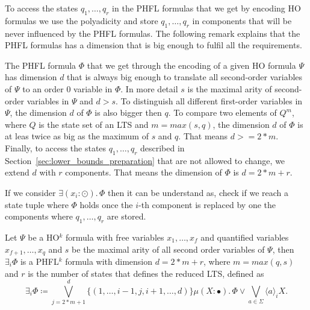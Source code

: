 To access the states $q_1, \dots, q_r$ in the PHFL formulas that we get by encoding HO formulas we use the polyadicity and store $q_1, \dots, q_r$ in components that will be never influenced by the PHFL formulas. The following remark explains that the PHFL formulas has a dimension that is big enough to fulfil all the requirements. 

\begin{remark}
    The PHFL formula $\Phi$ that we get through the encoding of a given HO formula $\Psi$ has dimension
    $d$ that is always big enough to translate all second-order variables of $\Psi$ to an order $0$ variable in
    $\Phi$. In more detail $s$ is the maximal arity of second-order variables in $\Psi$ and $d > s$. To distinguish all
    different first-order variables in $\Psi$, the dimension $d$ of $\Phi$ is also bigger then $q$.  To compare
    two  elements of $Q^{m}$, where $Q$ is the state set of an LTS and $m = max({s, q})$, the dimension $d$ of 
    $\Phi$ is  at leas twice as big as the maximum of $s$ and $q$. That means $d >= 2 * m$. Finally, to access the 
    states $q_1, \dots, q_r$ described in Section~\ref{sec:lower_bounds_preparation} that are not allowed to change, 
    we extend $d$ with $r$ components. That means the dimension of $\Phi$ is $d = 2* m + r$.
\end{remark}

If we consider $\exists (x_i \colon \odot).\,\Phi$ then it can be understand as, check if we reach a state tuple where $
\Phi$ holds once the $i$-th component is replaced by one the components where $q_1, \dots, q_r$ are stored.

\begin{definition}
    Let $\Psi$ be a HO$^k$ formula with free variables $x_1, \dots, x_f$ and quantified variables $x_{f+1}, \dots,
    x_q$ and $s$ be the maximal arity of all second order variables of $\Psi$, then $\exists_i \Phi$ is a PHFL$^k$
    formula with dimension $d = 2 * m + r$, where $m = max({q, s})$ and $r$ is the number of states that defines the 
    reduced LTS, defined as
    \[\exists_i \Phi \coloneqq \bigvee_{j=2*m+1}^d \{(1, \dots, i-1, j, i + 1, \dots, d)\} \mu (X
    \colon \bullet).\,\Phi \vee \bigvee_{a \in \Sigma} \langle a \rangle_i X.\]
\end{definition}

